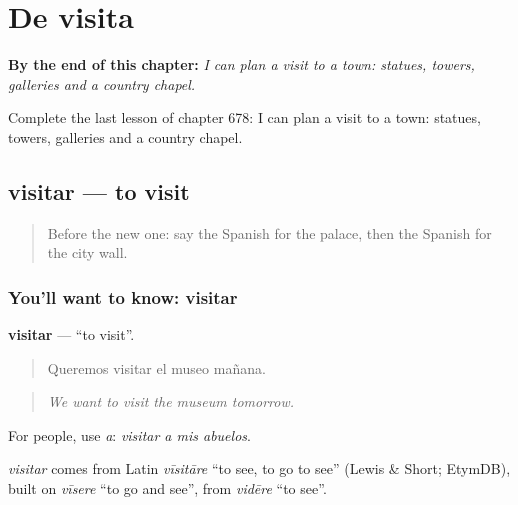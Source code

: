 
\chapter{De visita}
\label{ch:es-de-visita}

\begin{chapteropening}
\textbf{By the end of this chapter:} \emph{I can plan a visit to a town: statues, towers, galleries and a country chapel.}

Complete the last lesson of chapter 678: I can plan a visit to a town: statues, towers, galleries and a country chapel.
\end{chapteropening}

\section[visitar]{visitar — to visit}

\label{lesson:ES-C678-visitar}



\begin{quote}
Before the new one: say the Spanish for the palace, then the Spanish for the city wall.
\end{quote}

\subsection*{You'll want to know: visitar}
\textbf{visitar} — \textquotedblleft{}to visit\textquotedblright{}.

\begin{quote}
Queremos visitar el museo mañana.
\end{quote}

\begin{quote}
\emph{We want to visit the museum tomorrow.}
\end{quote}

For people, use \emph{a}: \emph{visitar a mis abuelos}.

\begin{cousinweb}
\emph{visitar} comes from Latin \emph{vīsitāre} \textquotedblleft{}to see, to go to see\textquotedblright{} (Lewis \& Short; EtymDB), built on \emph{vīsere} \textquotedblleft{}to go and see\textquotedblright{}, from \emph{vidēre} \textquotedblleft{}to see\textquotedblright{}.
\end{cousinweb}

